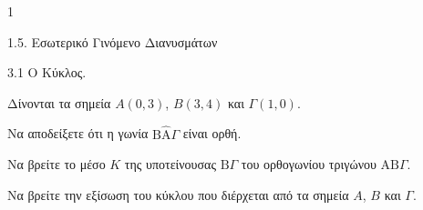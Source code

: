 \begin{ylh}{1}
    \item 1.5. Εσωτερικό Γινόμενο Διανυσμάτων
    \item 3.1 Ο Κύκλος.
\end{ylh}
Δίνονται τα σημεία $A(0,3)$, $B(3,4)$ και $\Gamma(1,0)$.
\begin{alist}
    \item Να αποδείξετε ότι η γωνία $\text{B}\hat{\text{A}}\Gamma$ είναι ορθή. 
    \item Να βρείτε το μέσο $K$ της υποτείνουσας $\text{B}\Gamma$ του ορθογωνίου τριγώνου $\text{AB}\Gamma$. 
    \item Να βρείτε την εξίσωση του κύκλου που διέρχεται από τα σημεία $A$, $B$ και $\Gamma$. 
\end{alist}